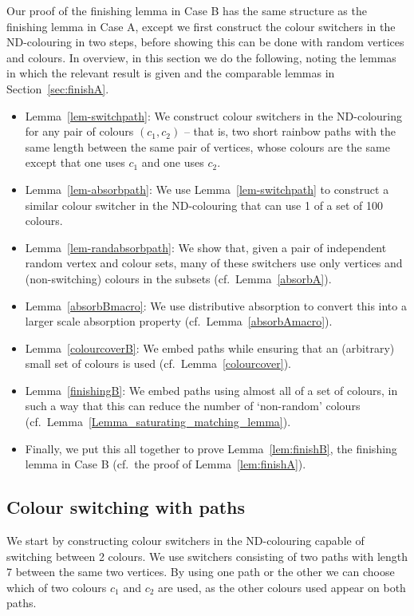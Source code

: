 
Our proof of the finishing lemma in Case B has the same structure as the finishing lemma in Case A, except we first construct the colour switchers in the ND-colouring in two steps, before showing this can be done with random vertices and colours. In overview, in this section we do the following, noting the lemmas in which the relevant result is given and the comparable lemmas in Section~\ref{sec:finishA}.
\begin{itemize}
\item Lemma~\ref{lem-switchpath}: We construct colour switchers in the ND-colouring for any pair of colours $(c_1,c_2)$ -- that is, two short rainbow paths with the same length between the same pair of vertices, whose colours are the same except that one uses $c_1$ and one uses $c_2$.
\item Lemma~\ref{lem-absorbpath}: We use Lemma~\ref{lem-switchpath} to construct a similar colour switcher in the ND-colouring that can use 1 of a set of 100 colours.
\item Lemma~\ref{lem-randabsorbpath}: We show that, given a pair of independent random vertex and colour sets, many of these switchers use only vertices and (non-switching) colours in the subsets (cf.\ Lemma~\ref{absorbA}).
\item Lemma~\ref{absorbBmacro}: We use distributive absorption to convert this into a larger scale absorption property (cf.\ Lemma~\ref{absorbAmacro}).
\item Lemma~\ref{colourcoverB}: We embed paths while ensuring that an (arbitrary) small set of colours is used (cf.\ Lemma~\ref{colourcover}).
\item Lemma~\ref{finishingB}: We embed paths using almost all of a set of colours, in such a way that this can reduce the number of `non-random' colours (cf.\ Lemma~\ref{Lemma_saturating_matching_lemma}).
\item Finally, we put this all together to prove Lemma~\ref{lem:finishB}, the finishing lemma in Case B (cf.\ the proof of Lemma~\ref{lem:finishA}).
\end{itemize}

\subsection{Colour switching with paths}\label{sec:switchers}
We start by constructing colour switchers in the ND-colouring capable of switching between 2 colours.
We use switchers consisting of two paths with length 7 between the same two vertices. By using one path or the other we can choose which of two colours $c_1$ and $c_2$ are used, as the other colours used appear on both paths.


